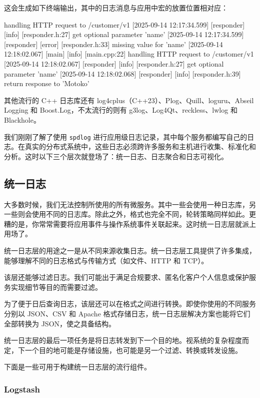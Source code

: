 \label{idx:1851}
\label{idx:1852}
这会生成如下终端输出，其中的日志消息与应用中宏的放置位置相对应：

\begin{codebox} handling HTTP request to /customer/v1
[2025-09-14 12:17:34.599] [responder] [info] [responder.h:27] get optional parameter 'name'
[2025-09-14 12:17:34.599] [responder] [error] [responder.h:33] missing value for 'name'
[2025-09-14 12:18:02.067] [main] [info] [main.cpp:22] handling HTTP request to /customer/v1
[2025-09-14 12:18:02.067] [responder] [info] [responder.h:27] get optional parameter 'name'
[2025-09-14 12:18:02.068] [responder] [info] [responder.h:39] return response to 'Motoko'
\end{codebox}

其他流行的 C++ 日志库还有 log4cplus（C++23）、Plog、Quill、loguru、Abseil Logging 和 Boost.Log，不太流行的则有 g3log、Log4Qt、reckless、lwlog 和 Blackhole。

我们刚刚了解了使用 \texttt{spdlog} 进行应用级日志记录，其中每个服务都编写自己的日志。在真实的分布式系统中，这些日志必须跨许多服务和主机进行收集、标准化和分析。这时以下三个层次就登场了：统一日志、日志聚合和日志可视化。

\subsection{统一日志}

\label{idx:1853}
大多数时候，我们无法控制所使用的所有微服务。其中一些会使用一种日志库，另一些则会使用不同的日志库。除此之外，格式也完全不同，轮转策略同样如此。更糟的是，你常常需要将应用事件与操作系统事件关联起来。这时统一日志层就派上用场了。

统一日志层的用途之一是从不同来源收集日志。统一日志层工具提供了许多集成，能够理解不同的日志格式与传输方式（如文件、HTTP 和 TCP）。

该层还能够过滤日志。我们可能出于满足合规要求、匿名化客户个人信息或保护服务实现细节等目的而需要过滤。

为了便于日后查询日志，该层还可以在格式之间进行转换。即使你使用的不同服务分别以 JSON、CSV 和 Apache 格式存储日志，统一日志层解决方案也能将它们全部转换为 JSON，使之具备结构。

统一日志层的最后一项任务是将日志转发到下一个目的地。视系统的复杂程度而定，下一个目的地可能是存储设施，也可能是另一个过滤、转换或转发设施。

下面是一些可用于构建统一日志层的流行组件。

\subsubsection{Logstash}

